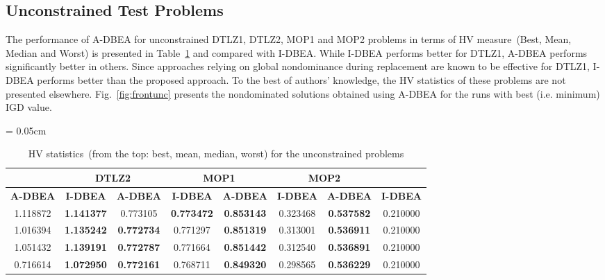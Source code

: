 \subsection{Unconstrained Test Problems}

The performance of A-DBEA for unconstrained DTLZ1, DTLZ2, MOP1 and MOP2 problems in terms of HV measure~(Best, Mean, Median and Worst) is presented in Table~\ref{tab:hvunc} and compared with I-DBEA. While I-DBEA performs better for DTLZ1, A-DBEA performs significantly better in others. Since approaches relying on global nondominance during replacement are known to be effective for DTLZ1, I-DBEA performs better than the proposed approach. To the best of authors' knowledge, the HV statistics of these problems are not presented elsewhere. Fig.~\ref{fig:frontunc} presents the nondominated solutions obtained using A-DBEA for the runs with best (i.e. minimum) IGD value. 

\begin{table}[!htb]\scriptsize
	\centering
	\caption{HV statistics~(from the top: best, mean, median, worst) for the unconstrained problems}
	\label{tab:hvunc}
	\tabcolsep = 0.05cm
	\begin{tabular}{|c|c|c|c|c|c|c|c|}
		\noalign{\smallskip}\hline
		\multicolumn{2}{|c|}{\textbf{DTLZ1}} & \multicolumn{2}{c|}{\textbf{DTLZ2}}   & \multicolumn{2}{c|}{\textbf{MOP1}}  & \multicolumn{2}{c|}{\textbf{MOP2}}  \\ \hline
		\textbf{A-DBEA}  & \textbf{I-DBEA}   & \textbf{A-DBEA}   & \textbf{I-DBEA}   & \textbf{A-DBEA}   & \textbf{I-DBEA} & \textbf{A-DBEA}   & \textbf{I-DBEA} \\ \hline
		1.118872         & \textbf{1.141377} & 0.773105          & \textbf{0.773472} & \textbf{0.853143} & 0.323468        & \textbf{0.537582} & 0.210000        \\
		1.016394         & \textbf{1.135242} & \textbf{0.772734} & 0.771297          & \textbf{0.851319} & 0.313001        & \textbf{0.536911} & 0.210000        \\
		1.051432         & \textbf{1.139191} & \textbf{0.772787} & 0.771664          & \textbf{0.851442} & 0.312540        & \textbf{0.536891} & 0.210000        \\
		0.716614         & \textbf{1.072950} & \textbf{0.772161} & 0.768711          & \textbf{0.849320} & 0.298565        & \textbf{0.536229} & 0.210000        \\ \hline
	\end{tabular}
\end{table}

